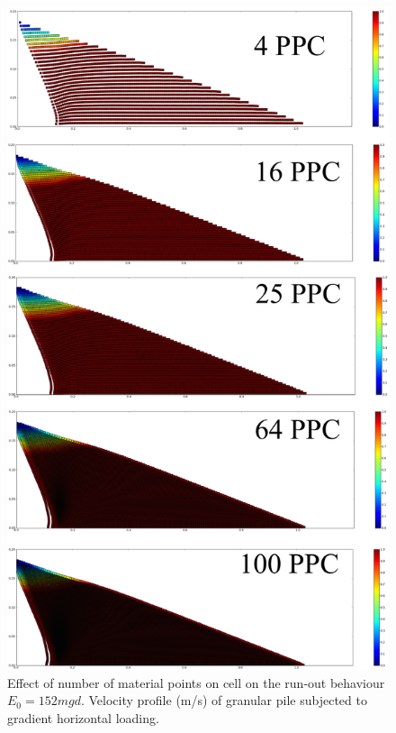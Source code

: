 \begin{figure}[tbhp]
\centering
\includegraphics[height=0.9\textheight]{MPM_500ppc}
\caption{Effect of number of material points on cell on the run-out behaviour 
$E_0=152mgd$. 
Velocity profile (\si{\m/\s}) of granular pile subjected to gradient horizontal 
loading.}
\label{fig:MPM_500ppc}
\end{figure}

